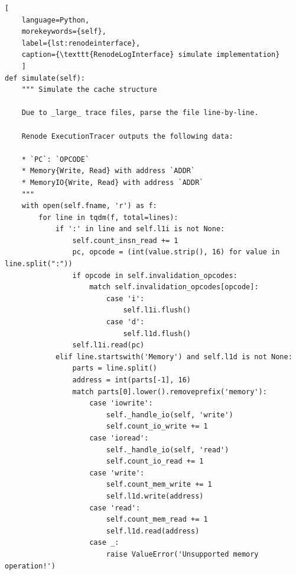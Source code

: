 \begin{center}
\centering
\begin{minipage}{\linewidth}
\begin{lstlisting}[
    language=Python,
	morekeywords={self},
    label={lst:renodeinterface},
    caption={\texttt{RenodeLogInterface} simulate implementation}
    ]
def simulate(self):
    """ Simulate the cache structure

    Due to _large_ trace files, parse the file line-by-line.

    Renode ExecutionTracer outputs the following data:

    * `PC`: `OPCODE`
    * Memory{Write, Read} with address `ADDR`
    * MemoryIO{Write, Read} with address `ADDR`
    """
    with open(self.fname, 'r') as f:
        for line in tqdm(f, total=lines):
            if ':' in line and self.l1i is not None:
                self.count_insn_read += 1
                pc, opcode = (int(value.strip(), 16) for value in line.split(":"))
                if opcode in self.invalidation_opcodes:
                    match self.invalidation_opcodes[opcode]:
                        case 'i':
                            self.l1i.flush()
                        case 'd':
                            self.l1d.flush()
                self.l1i.read(pc)
            elif line.startswith('Memory') and self.l1d is not None:
                parts = line.split()
                address = int(parts[-1], 16)
                match parts[0].lower().removeprefix('memory'):
                    case 'iowrite':
                        self._handle_io(self, 'write')
                        self.count_io_write += 1
                    case 'ioread':
                        self._handle_io(self, 'read')
                        self.count_io_read += 1
                    case 'write':
                        self.count_mem_write += 1
                        self.l1d.write(address)
                    case 'read':
                        self.count_mem_read += 1
                        self.l1d.read(address)
                    case _:
                        raise ValueError('Unsupported memory operation!')
\end{lstlisting}
\end{minipage}
\end{center}



